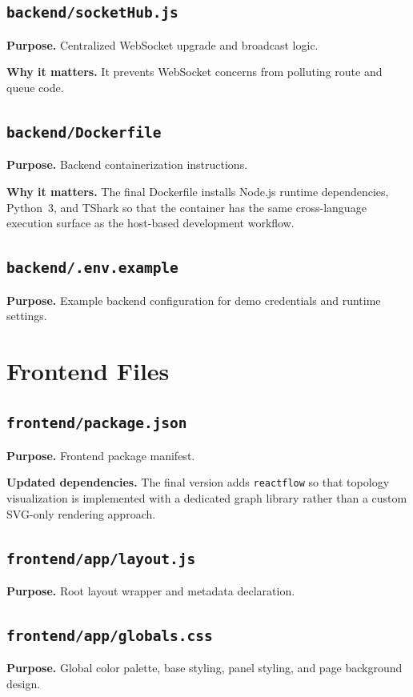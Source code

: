 \documentclass[12pt,a4paper]{report}
\begin{document}
\section{\texttt{backend/socketHub.js}}
\textbf{Purpose.} Centralized WebSocket upgrade and broadcast logic.

\textbf{Why it matters.} It prevents WebSocket concerns from polluting route and queue code.

\section{\texttt{backend/Dockerfile}}
\textbf{Purpose.} Backend containerization instructions.

\textbf{Why it matters.} The final Dockerfile installs Node.js runtime dependencies, Python~3, and TShark so that the container has the same cross-language execution surface as the host-based development workflow.

\section{\texttt{backend/.env.example}}
\textbf{Purpose.} Example backend configuration for demo credentials and runtime settings.

\chapter{Frontend Files}
\section{\texttt{frontend/package.json}}
\textbf{Purpose.} Frontend package manifest.

\textbf{Updated dependencies.} The final version adds \texttt{reactflow} so that topology visualization is implemented with a dedicated graph library rather than a custom SVG-only rendering approach.

\section{\texttt{frontend/app/layout.js}}
\textbf{Purpose.} Root layout wrapper and metadata declaration.

\section{\texttt{frontend/app/globals.css}}
\textbf{Purpose.} Global color palette, base styling, panel styling, and page background design.
\end{document}
